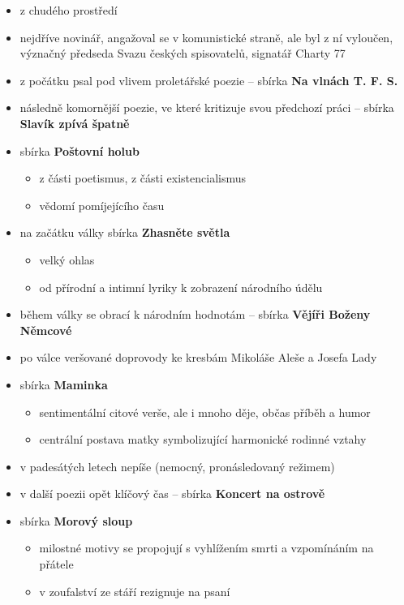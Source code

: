 \begin{itemize}
\item z chudého prostředí
\item nejdříve novinář, angažoval se v komunistické straně, ale byl z ní vyloučen, význačný předseda Svazu českých spisovatelů, signatář Charty 77
\item z počátku psal pod vlivem proletářské poezie -- sbírka \textbf{Na vlnách T. F. S.}
\item následně komornější poezie, ve které kritizuje svou předchozí práci -- sbírka \textbf{Slavík zpívá špatně}
\item sbírka \textbf{Poštovní holub}
	\begin{itemize}
	\item z části poetismus, z části existencialismus
	\item vědomí pomíjejícího času
	\end{itemize}
\item na začátku války sbírka \textbf{Zhasněte světla}
	\begin{itemize}
	\item velký ohlas
	\item od přírodní a intimní lyriky k zobrazení národního údělu 
	\end{itemize}
\item během války se obrací k národním hodnotám -- sbírka \textbf{Vějíři Boženy Němcové}
\item po válce veršované doprovody ke kresbám Mikoláše Aleše a Josefa Lady
\item sbírka \textbf{Maminka}
	\begin{itemize}
	\item sentimentální citové verše, ale i mnoho děje, občas příběh a humor
	\item centrální postava matky symbolizující harmonické rodinné vztahy
	\end{itemize}
\item v padesátých letech nepíše (nemocný, pronásledovaný režimem)
\item v další poezii opět klíčový čas -- sbírka \textbf{Koncert na ostrově}
\item sbírka \textbf{Morový sloup}
	\begin{itemize}
	\item milostné motivy se propojují s vyhlížením smrti a vzpomínáním na přátele
	\item v zoufalství ze stáří rezignuje na psaní 
	\end{itemize}
\end{itemize}

